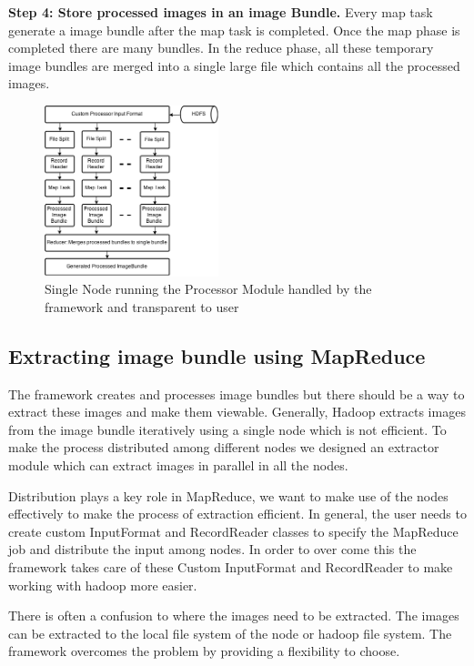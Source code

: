 \documentclass[conference]{IEEEtran}
\begin{document}
\textbf{Step 4: Store processed images in an image Bundle.} Every map task generate a image bundle after the map task is completed. Once the map phase is completed there are many bundles. In the reduce phase, all these temporary image bundles are merged into a single large file which contains all the processed images.

\begin{figure}[h]
	\centering
	\includegraphics[width=0.45\textwidth]{pro-node}
	\caption{Single Node running the Processor Module handled by the framework and transparent to user}
	\label{fig:pro-node}
\end{figure}

\subsection{Extracting image bundle using MapReduce}
The framework creates and processes image bundles but there should be a way to extract these images and make them viewable. Generally, Hadoop extracts images from the image bundle iteratively using a single node which is not efficient. To make the process distributed among different nodes we designed an extractor module which can extract images in parallel in all the nodes. 

Distribution plays a key role in MapReduce, we want to make use of the nodes effectively to make the process of extraction efficient. In general, the user needs to create custom InputFormat and RecordReader classes to specify the MapReduce job and distribute the input among nodes. In order to over come this the framework takes care of these Custom InputFormat and RecordReader to make working with hadoop more easier.

There is often a confusion to where the images need to be extracted. The images can be extracted to the local file system of the node or hadoop file system. The framework overcomes the problem by providing a flexibility to choose.
 
\end{document}
